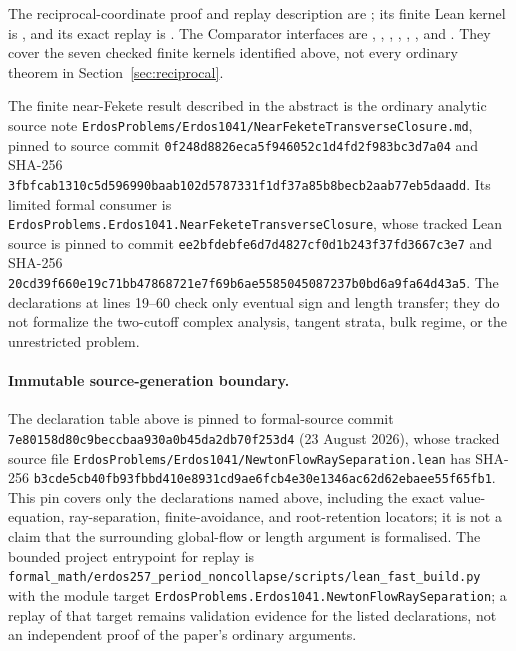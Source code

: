 \documentclass[11pt]{article}
\begin{document}
The reciprocal-coordinate proof and replay description are
; its finite Lean
kernel is
, and its exact
replay is
.
The Comparator interfaces are
,
,
,
,
,
, and
.  They cover the seven checked
finite kernels identified above, not every ordinary theorem in
Section~\ref{sec:reciprocal}.

The finite near-Fekete result described in the abstract is the ordinary
analytic source note
\texttt{ErdosProblems/Erdos1041/NearFeketeTransverseClosure.md}, pinned to
source commit
\texttt{0f248d8826eca5f946052c1d4fd2f983bc3d7a04} and SHA-256
{\footnotesize\nolinkurl{3fbfcab1310c5d596990baab102d5787331f1df37a85b8becb2aab77eb5daadd}}.
Its limited formal consumer is
\texttt{ErdosProblems.Erdos1041.NearFeketeTransverseClosure}, whose tracked
Lean source is pinned to commit
\texttt{ee2bfdebfe6d7d4827cf0d1b243f37fd3667c3e7} and SHA-256
{\footnotesize\nolinkurl{20cd39f660e19c71bb47868721e7f69b6ae5585045087237b0bd6a9fa64d43a5}}.
The declarations at lines 19--60 check only eventual sign and length transfer;
they do not formalize the two-cutoff complex analysis, tangent strata, bulk
regime, or the unrestricted problem.

\paragraph{Immutable source-generation boundary.}
The declaration table above is pinned to formal-source commit
\texttt{7e80158d80c9beccbaa930a0b45da2db70f253d4} (23 August 2026), whose
tracked source file
\texttt{ErdosProblems/Erdos1041/NewtonFlowRaySeparation.lean} has SHA-256
{\footnotesize\nolinkurl{b3cde5cb40fb93fbbd410e8931cd9ae6fcb4e30e1346ac62d62ebaee55f65fb1}}.
This pin covers only the declarations named above, including the exact
value-equation, ray-separation, finite-avoidance, and root-retention locators;
it is not a claim that the surrounding global-flow or length argument is
formalised.  The bounded project entrypoint for replay is
\texttt{formal\_math/erdos257\_period\_noncollapse/scripts/lean\_fast\_build.py}
with the module target
\texttt{ErdosProblems.Erdos1041.NewtonFlowRaySeparation}; a replay of that
target remains validation evidence for the listed declarations, not an
independent proof of the paper's ordinary arguments.
\par
\endgroup
\end{document}

